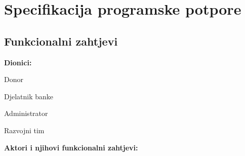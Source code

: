 
\chapter{Specifikacija programske potpore}

\section{Funkcionalni zahtjevi}

\noindent \textbf{Dionici:}

\begin{packed_enum}
	
	\item Donor		
	\item Djelatnik banke	
	\item Administrator
	\item Razvojni tim
	
\end{packed_enum}

\noindent \textbf{Aktori i njihovi funkcionalni zahtjevi:}


